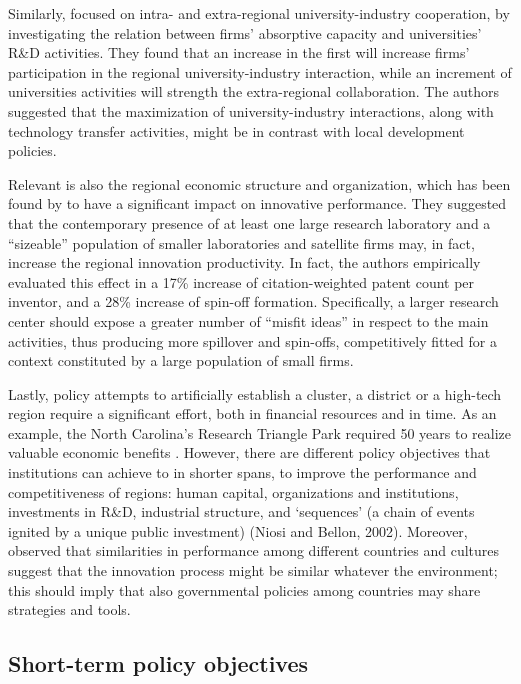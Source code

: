 Similarly, \citet{AzagraCaro2010} focused on intra- and extra-regional university-industry cooperation, by investigating the relation between firms' absorptive capacity and universities' R\&D activities. They found that an increase in the first will increase firms' participation in the regional university-industry interaction, while an increment of universities activities will strength the extra-regional collaboration. The authors suggested that the maximization of university-industry interactions, along with technology transfer activities, might be in contrast with local development policies.

Relevant is also the regional economic structure and organization, which has been found by \citet{Agrawal2014} to have a significant impact on innovative performance. They suggested that the contemporary presence of at least one large research laboratory and a \enquote{sizeable} population of smaller laboratories and satellite firms may, in fact, increase the regional innovation productivity. In fact, the authors empirically evaluated this effect in a 17\% increase of citation-weighted patent count per inventor, and a 28\% increase of spin-off formation. Specifically, a larger research center should expose a greater number of \enquote{misfit ideas} in respect to the main activities, thus producing more spillover and spin-offs, competitively fitted for a context constituted by a large population of small firms.

Lastly, policy attempts to artificially establish a cluster, a district or a high-tech region require a significant effort, both in financial resources and in time. As an example, the North Carolina's Research Triangle Park required 50 years to realize valuable economic benefits \citep{Bercovitz2006}. However, there are different policy objectives that institutions can achieve to in shorter spans, to improve the performance and competitiveness of regions: human capital, organizations and institutions, investments in R\&D, industrial structure, and ‘sequences' (a chain of events ignited by a unique public investment) (Niosi and Bellon, 2002). Moreover, \citet{Heher2006} observed that similarities in performance among different countries and cultures suggest that the innovation process might be similar whatever the environment; this should imply that also governmental policies among countries may share strategies and tools.  

\subsection{Short-term policy objectives}

